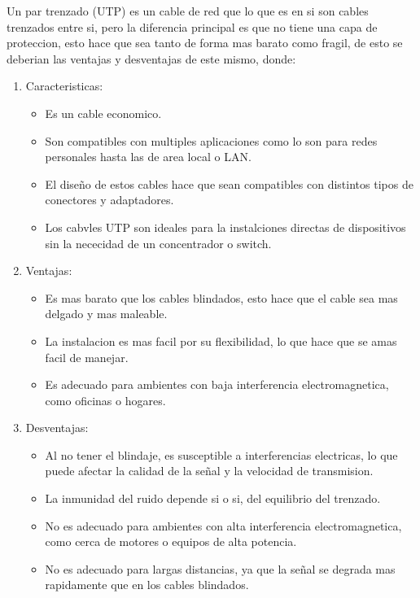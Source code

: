 \documentclass[a4paper,12pt]{article}
\begin{document}
Un par trenzado (UTP) es un cable de red que lo que es en si son cables trenzados entre si, pero la diferencia principal es que no tiene una capa de proteccion, esto hace que sea tanto de forma mas barato como fragil, de esto se deberian las ventajas y desventajas de este mismo, donde:

\begin{enumerate}
    \item Caracteristicas:
    \begin{itemize}
        \item Es un cable economico.
        \item Son compatibles con multiples aplicaciones como lo son para redes personales hasta las de area local o LAN.
        \item El diseño de estos cables hace que sean compatibles con distintos tipos de conectores y adaptadores.
        \item Los cabvles UTP son ideales para la instalciones directas de dispositivos sin la nececidad de un concentrador o switch.
    \end{itemize}
    \item Ventajas:
    \begin{itemize}
        \item Es mas barato que los cables blindados, esto hace que el cable sea mas delgado y mas maleable.
        \item La instalacion es mas facil por su flexibilidad, lo que hace que se amas facil de manejar.
        \item Es adecuado para ambientes con baja interferencia electromagnetica, como oficinas o hogares.
    \end{itemize}
    \item Desventajas:
    \begin{itemize}
        \item Al no tener el blindaje, es susceptible a interferencias electricas, lo que puede afectar la calidad de la señal y la velocidad de transmision.
        \item La inmunidad del ruido depende si o si, del equilibrio del trenzado.
        \item No es adecuado para ambientes con alta interferencia electromagnetica, como cerca de motores o equipos de alta potencia.
        \item No es adecuado para largas distancias, ya que la señal se degrada mas rapidamente que en los cables blindados.
    \end{itemize}
\end{enumerate}
\newpage
\end{document}
